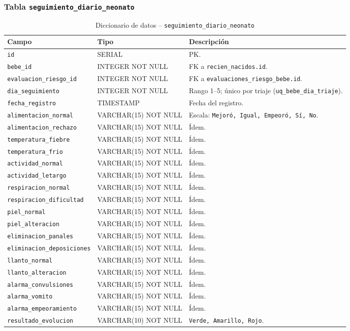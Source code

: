 \documentclass[12pt,letterpaper]{article}
\begin{document}
\subsubsection{Tabla \texttt{seguimiento\_diario\_neonato}}

\begin{longtable}{p{}p{}p{}}
\caption{Diccionario de datos -- \texttt{seguimiento\_diario\_neonato}}\\\toprule
\textbf{Campo} & \textbf{Tipo} & \textbf{Descripción} \\\midrule
\endhead
\texttt{id} & SERIAL & PK.\\\hline
\texttt{bebe\_id} & INTEGER NOT NULL & FK a \texttt{recien\_nacidos.id}.\\\hline
\texttt{evaluacion\_riesgo\_id} & INTEGER NOT NULL & FK a \texttt{evaluaciones\_riesgo\_bebe.id}.\\\hline
\texttt{dia\_seguimiento} & INTEGER NOT NULL & Rango 1--5; único por triaje (\texttt{uq\_bebe\_dia\_triaje}).\\\hline
\texttt{fecha\_registro} & TIMESTAMP & Fecha del registro.\\\hline
\texttt{alimentacion\_normal} & VARCHAR(15) NOT NULL & Escala: \texttt{Mejoró, Igual, Empeoró, Sí, No}.\\\hline
\texttt{alimentacion\_rechazo} & VARCHAR(15) NOT NULL & Ídem.\\\hline
\texttt{temperatura\_fiebre} & VARCHAR(15) NOT NULL & Ídem.\\\hline
\texttt{temperatura\_frio} & VARCHAR(15) NOT NULL & Ídem.\\\hline
\texttt{actividad\_normal} & VARCHAR(15) NOT NULL & Ídem.\\\hline
\texttt{actividad\_letargo} & VARCHAR(15) NOT NULL & Ídem.\\\hline
\texttt{respiracion\_normal} & VARCHAR(15) NOT NULL & Ídem.\\\hline
\texttt{respiracion\_dificultad} & VARCHAR(15) NOT NULL & Ídem.\\\hline
\texttt{piel\_normal} & VARCHAR(15) NOT NULL & Ídem.\\\hline
\texttt{piel\_alteracion} & VARCHAR(15) NOT NULL & Ídem.\\\hline
\texttt{eliminacion\_panales} & VARCHAR(15) NOT NULL & Ídem.\\\hline
\texttt{eliminacion\_deposiciones} & VARCHAR(15) NOT NULL & Ídem.\\\hline
\texttt{llanto\_normal} & VARCHAR(15) NOT NULL & Ídem.\\\hline
\texttt{llanto\_alteracion} & VARCHAR(15) NOT NULL & Ídem.\\\hline
\texttt{alarma\_convulsiones} & VARCHAR(15) NOT NULL & Ídem.\\\hline
\texttt{alarma\_vomito} & VARCHAR(15) NOT NULL & Ídem.\\\hline
\texttt{alarma\_empeoramiento} & VARCHAR(15) NOT NULL & Ídem.\\\hline
\texttt{resultado\_evolucion} & VARCHAR(10) NOT NULL & \texttt{Verde, Amarillo, Rojo}.\\\bottomrule
\end{longtable}
\end{document}
